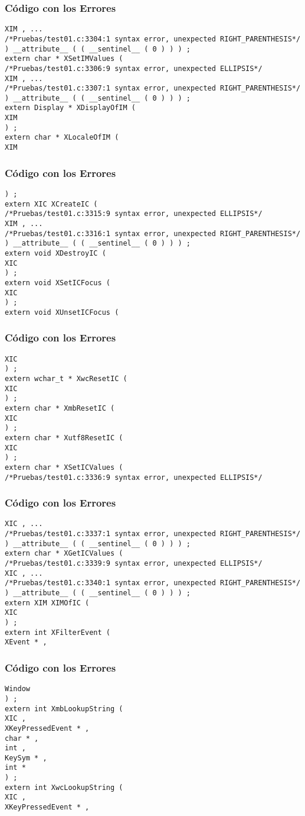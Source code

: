\documentclass{beamer}
\begin{document}
\begin{frame}[fragile]
\frametitle{C\'odigo con los Errores}
\begin{verbatim}
XIM , ... 
/*Pruebas/test01.c:3304:1 syntax error, unexpected RIGHT_PARENTHESIS*/
) __attribute__ ( ( __sentinel__ ( 0 ) ) ) ; 
extern char * XSetIMValues ( 
/*Pruebas/test01.c:3306:9 syntax error, unexpected ELLIPSIS*/
XIM , ... 
/*Pruebas/test01.c:3307:1 syntax error, unexpected RIGHT_PARENTHESIS*/
) __attribute__ ( ( __sentinel__ ( 0 ) ) ) ; 
extern Display * XDisplayOfIM ( 
XIM 
) ; 
extern char * XLocaleOfIM ( 
XIM 
\end{verbatim}
\end{frame}
\begin{frame}[fragile]
\frametitle{C\'odigo con los Errores}
\begin{verbatim}
) ; 
extern XIC XCreateIC ( 
/*Pruebas/test01.c:3315:9 syntax error, unexpected ELLIPSIS*/
XIM , ... 
/*Pruebas/test01.c:3316:1 syntax error, unexpected RIGHT_PARENTHESIS*/
) __attribute__ ( ( __sentinel__ ( 0 ) ) ) ; 
extern void XDestroyIC ( 
XIC 
) ; 
extern void XSetICFocus ( 
XIC 
) ; 
extern void XUnsetICFocus ( 
\end{verbatim}
\end{frame}
\begin{frame}[fragile]
\frametitle{C\'odigo con los Errores}
\begin{verbatim}
XIC 
) ; 
extern wchar_t * XwcResetIC ( 
XIC 
) ; 
extern char * XmbResetIC ( 
XIC 
) ; 
extern char * Xutf8ResetIC ( 
XIC 
) ; 
extern char * XSetICValues ( 
/*Pruebas/test01.c:3336:9 syntax error, unexpected ELLIPSIS*/
\end{verbatim}
\end{frame}
\begin{frame}[fragile]
\frametitle{C\'odigo con los Errores}
\begin{verbatim}
XIC , ... 
/*Pruebas/test01.c:3337:1 syntax error, unexpected RIGHT_PARENTHESIS*/
) __attribute__ ( ( __sentinel__ ( 0 ) ) ) ; 
extern char * XGetICValues ( 
/*Pruebas/test01.c:3339:9 syntax error, unexpected ELLIPSIS*/
XIC , ... 
/*Pruebas/test01.c:3340:1 syntax error, unexpected RIGHT_PARENTHESIS*/
) __attribute__ ( ( __sentinel__ ( 0 ) ) ) ; 
extern XIM XIMOfIC ( 
XIC 
) ; 
extern int XFilterEvent ( 
XEvent * , 
\end{verbatim}
\end{frame}
\begin{frame}[fragile]
\frametitle{C\'odigo con los Errores}
\begin{verbatim}
Window 
) ; 
extern int XmbLookupString ( 
XIC , 
XKeyPressedEvent * , 
char * , 
int , 
KeySym * , 
int * 
) ; 
extern int XwcLookupString ( 
XIC , 
XKeyPressedEvent * , 
\end{verbatim}
\end{frame}
\end{document}
